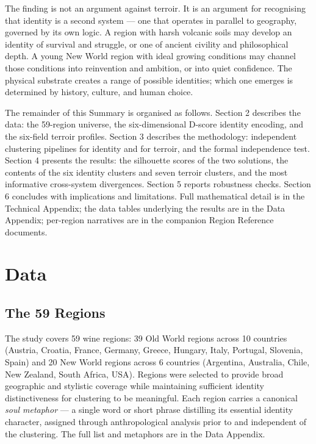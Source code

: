 \documentclass[11pt]{article}
\begin{document}
The finding is not an argument against terroir. It is an argument for recognising that identity is a second system --- one that operates in parallel to geography, governed by its own logic. A region with harsh volcanic soils may develop an identity of survival and struggle, or one of ancient civility and philosophical depth. A young New World region with ideal growing conditions may channel those conditions into reinvention and ambition, or into quiet confidence. The physical substrate creates a range of possible identities; which one emerges is determined by history, culture, and human choice.

The remainder of this Summary is organised as follows. Section 2 describes the data: the 59-region universe, the six-dimensional D-score identity encoding, and the six-field terroir profiles. Section 3 describes the methodology: independent clustering pipelines for identity and for terroir, and the formal independence test. Section 4 presents the results: the silhouette scores of the two solutions, the contents of the six identity clusters and seven terroir clusters, and the most informative cross-system divergences. Section 5 reports robustness checks. Section 6 concludes with implications and limitations. Full mathematical detail is in the Technical Appendix; the data tables underlying the results are in the Data Appendix; per-region narratives are in the companion Region Reference documents.

\section{Data}

\subsection{The 59 Regions}
The study covers 59 wine regions: 39 Old World regions across 10 countries (Austria, Croatia, France, Germany, Greece, Hungary, Italy, Portugal, Slovenia, Spain) and 20 New World regions across 6 countries (Argentina, Australia, Chile, New Zealand, South Africa, USA). Regions were selected to provide broad geographic and stylistic coverage while maintaining sufficient identity distinctiveness for clustering to be meaningful. Each region carries a canonical \emph{soul metaphor} --- a single word or short phrase distilling its essential identity character, assigned through anthropological analysis prior to and independent of the clustering. The full list and metaphors are in the Data Appendix.
\end{document}
